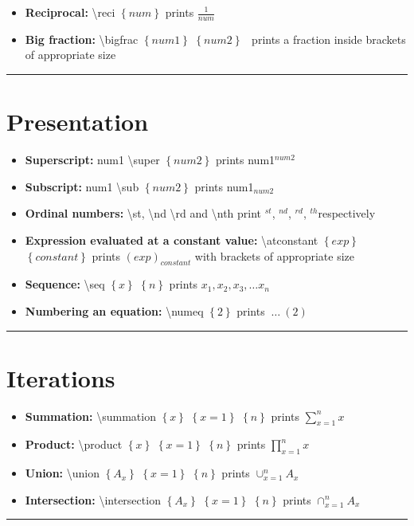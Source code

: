 \documentclass[12pt]{article}
\newcommand{\esc}{\textbackslash}
\newcommand{\braces}[1]{\ensuremath{\left\lbrace #1 \right\rbrace}}
\newcommand{\bigbrac}[1]{\ensuremath{\left( #1 \right)}}
\newcommand{\reci}[1]{\ensuremath{\displaystyle\frac{1}{#1}}}
\newcommand{\super}[1]{\ensuremath{^{#1}}}
\newcommand{\sub}[1]{\ensuremath{_{#1}}}
\newcommand{\st}{\ensuremath{^{st}}}
\newcommand{\nd}{\ensuremath{^{nd}}}
\newcommand{\rd}{\ensuremath{^{rd}}}
\newcommand{\nth}{\ensuremath{^{th}}}
\newcommand{\atconstant}[2]{\ensuremath{\bigbrac{#1}_{#2}}}
\newcommand{\seq}[2]{\ensuremath{#1_1, #1_2, #1_3, \dots #1_{#2}}}
\newcommand{\numeq}[1]{\ensuremath{ \ \dots \ (#1)}}
\newcommand{\summation}[3]{\ensuremath{\sum\limits_{#2}^{#3} #1}}
\newcommand{\product}[3]{\ensuremath{\prod\limits_{#2}^{#3} #1}}
\newcommand{\union}[3]{\ensuremath{\cup_{#2}^{#3} #1}}
\newcommand{\intersection}[3]{\ensuremath{\cap_{#2}^{#3} #1}}
\newcommand{\drawline}{\vspace{5mm}\hrule}
\newcommand{\point}[1]{\item\textbf{#1:}}
\begin{document}
\begin{itemize}

\point{Reciprocal} \esc reci \braces{num} prints \reci{num}
\point{Big fraction} \esc bigfrac \braces{num1} \braces{num2} \ prints a fraction inside brackets of appropriate size

\end{itemize}
\drawline

\section{Presentation}

\begin{itemize}

\point{Superscript} num1 \esc super \braces{num2} prints num1\super{num2}
\point{Subscript} num1 \esc sub \braces{num2} prints num1\sub{num2}
\point{Ordinal numbers} \esc st, \esc nd \esc rd and \esc nth print \st, \nd, \rd, \nth respectively
\point{Expression evaluated at a constant value} \esc atconstant \braces{exp} \braces{constant} prints \atconstant{exp}{constant} with brackets of appropriate size
\point{Sequence} \esc seq \braces{x} \braces{n} prints \seq{x}{n}
\point{Numbering an equation} \esc numeq \braces{2} prints \numeq{2} 

\end{itemize}
\drawline

\section{Iterations}

\begin{itemize}

\point{Summation} \esc summation \braces{x} \braces{x=1} \braces{n} prints \summation{x}{x=1}{n}
\point{Product} \esc product \braces{x} \braces{x=1} \braces{n} prints \product{x}{x=1}{n}
\point{Union} \esc union \braces{A_x} \braces{x=1} \braces{n} prints \union{A_x}{x=1}{n}
\point{Intersection} \esc intersection \braces{A_x} \braces{x=1} \braces{n} prints \intersection{A_x}{x=1}{n}

\end{itemize}
\drawline
\end{document}
